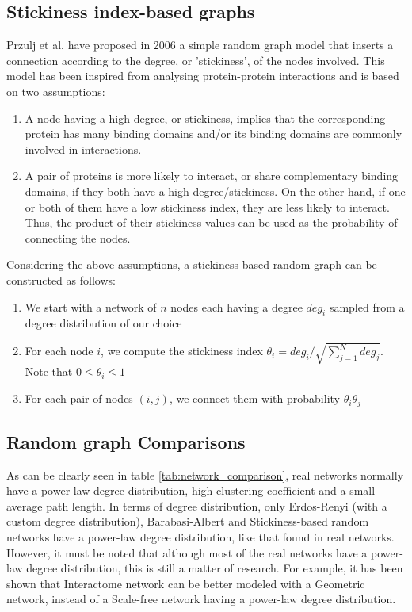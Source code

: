 \subsection{Stickiness index-based graphs}

Przulj et al. have proposed in 2006 a simple random
graph model that inserts a connection according to the degree, or 'stickiness',
of the nodes involved\cite{prvzulj2006modelling}. This model has been inspired
from analysing protein-protein interactions and is based on two assumptions:
\begin{enumerate}
 \item A node having a high degree, or stickiness, implies that the
corresponding protein has many binding domains and/or its binding domains are
commonly involved in interactions.

 \item A pair of proteins is more likely to interact, or share complementary
binding domains, if they both have a high degree/stickiness. On the other hand,
if one or both of them have a low stickiness index, they are less likely to
interact. Thus, the product of their stickiness values can be used as the
probability of connecting the nodes.
\end{enumerate}

Considering the above assumptions, a stickiness based random graph can be
constructed as follows:
\begin{enumerate}
 \item We start with a network of $n$ nodes each having a degree $ deg_i $
sampled from a degree distribution of our choice
 \item For each node $i$, we compute the stickiness index $
\theta_i=deg_i/\sqrt{\sum_{j=1}^{N}deg_j}. $ Note that $ 0 \leq \theta_i \leq 1$
 \item For each pair of nodes $(i,j)$, we connect them with probability $
\theta_i \theta_j $
\end{enumerate}


\subsection{Random graph Comparisons}

As can be clearly seen in table \ref{tab:network_comparison}, real networks
normally have a power-law degree distribution, high clustering coefficient and
a small average path length. In terms of degree distribution, only Erdos-Renyi
(with a custom degree distribution), Barabasi-Albert and Stickiness-based
random networks have a power-law degree distribution, like that found in real
networks. However, it must be noted that although most of the real networks
have a power-law degree distribution, this is still a matter of research. For
example, it has been shown that Interactome network can be better modeled with
a Geometric network, instead of a Scale-free network having a power-law degree
distribution\cite{prvzulj2004modeling}.

